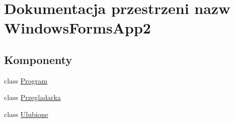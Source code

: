 \hypertarget{namespace_windows_forms_app2}{}\section{Dokumentacja przestrzeni nazw Windows\+Forms\+App2}
\label{namespace_windows_forms_app2}
\subsection*{Komponenty}
\begin{DoxyCompactItemize}
\item 
class \hyperlink{class_windows_forms_app2_1_1_program}{Program}
\item 
class \hyperlink{class_windows_forms_app2_1_1_przegladarka}{Przegladarka}
\item 
class \hyperlink{class_windows_forms_app2_1_1_ulubione}{Ulubione}
\end{DoxyCompactItemize}
